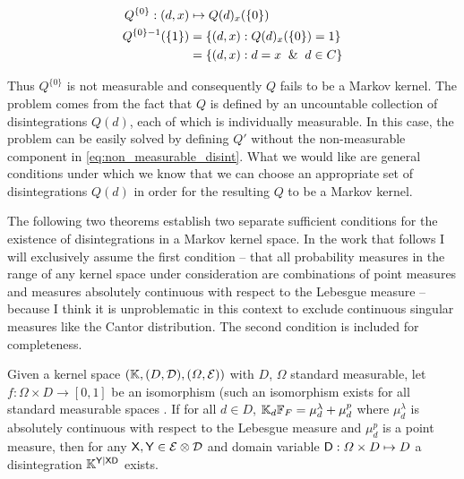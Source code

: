 \begin{align}
	Q^{\{0\}}:(d,x)&\mapsto Q(d)_x(\{0\})\\
	Q^{\{0\}-1}(\{1\})&=\{(d,x):Q(d)_x(\{0\})=1\}\\
	&= \{(d,x):d=x\And d\in C\}
\end{align}

Thus $Q^{\{0\}}$ is not measurable and consequently $Q$ fails to be a Markov kernel. The problem comes from the fact that $Q$ is defined by an uncountable collection of disintegrations $Q(d)$, each of which is individually measurable. In this case, the problem can be easily solved by defining $Q'$ without the non-measurable component in \ref{eq:non_measurable_disint}. What we would like are general conditions under which we know that we can choose an appropriate set of disintegrations $Q(d)$ in order for the resulting $Q$ to be a Markov kernel.

The following two theorems establish two separate sufficient conditions for the existence of disintegrations in a Markov kernel space. In the work that follows I will exclusively assume the first condition -- that all probability measures in the range of any kernel space under consideration are combinations of point measures and measures absolutely continuous with respect to the Lebesgue measure -- because I think it is unproblematic in this context to exclude continuous singular measures like the Cantor distribution. The second condition is included for completeness.

\begin{theorem}
Given a kernel space $(\mathbb{K},(D,\mathcal{D}),(\Omega,\mathcal{E}))$ with $D$, $\Omega$ standard measurable, let $f:\Omega\times D\to [0,1]$ be an isomorphism (such an isomorphism exists for all standard measurable spaces \citep{cinlar_probability_2011}. If for all $d\in D$, $\mathbb{K}_d\mathbb{F}_F = \mu_d^\lambda+\mu_d^p$ where $\mu_d^\lambda$ is absolutely continuous with respect to the Lebesgue measure and $\mu_d^p$ is a point measure, then for any $\mathsf{X},\mathsf{Y}\in \mathcal{E}\otimes\mathcal{D}$ and domain variable $\mathsf{D}:\Omega\times D\mapsto D$ a disintegration $\mathbb{K}^{\mathsf{Y}|\mathsf{X}\mathsf{D}}$ exists.
\end{theorem}

